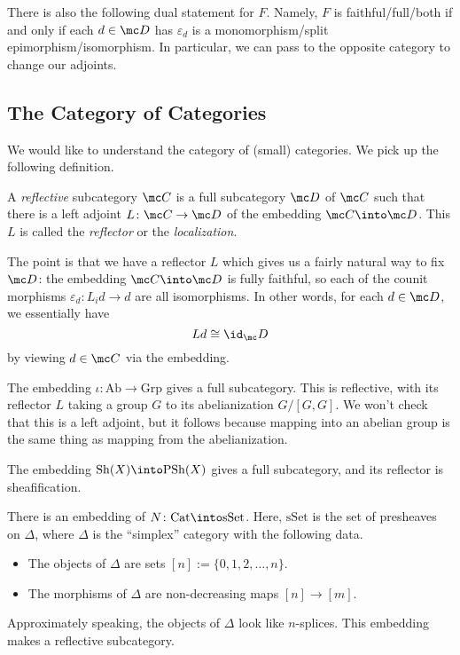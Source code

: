\documentclass[../notes.tex]{subfiles}
\begin{document}
\begin{remark}
	There is also the following dual statement for $F$. Namely, $F$ is faithful/full/both if and only if each $d\in\mc D$ has $\varepsilon_d$ is a monomorphism/split epimorphism/isomorphism. In particular, we can pass to the opposite category to change our adjoints.
\end{remark}

\subsection{The Category of Categories}
We would like to understand the category of (small) categories. We pick up the following definition.
\begin{definition}
	A \textit{reflective} subcategory $\mc C$ is a full subcategory $\mc D$ of $\mc C$ such that there is a left adjoint $L\colon\mc C\to\mc D$ of the embedding $\mc C\into\mc D$. This $L$ is called the \textit{reflector} or the \textit{localization}.
\end{definition}
The point is that we have a reflector $L$ which gives us a fairly natural way to fix $\mc D$: the embedding $\mc C\into\mc D$ is fully faithful, so each of the counit morphisms $\varepsilon_d\colon L_id\to d$ are all isomorphisms. In other words, for each $d\in\mc D$, we essentially have
\[Ld\cong\id_\mc D\]
by viewing $d\in\mc C$ via the embedding.
\begin{example}
	The embedding $\iota\colon\mathrm{Ab}\to\mathrm{Grp}$ gives a full subcategory. This is reflective, with its reflector $L$ taking a group $G$ to its abelianization $G/[G,G]$. We won't check that this is a left adjoint, but it follows because mapping into an abelian group is the same thing as mapping from the abelianization.
\end{example}
\begin{example}
	The embedding $\mathrm{Sh}(X)\into\mathrm{PSh}(X)$ gives a full subcategory, and its reflector is sheafification.
\end{example}
\begin{exe}
	There is an embedding of $N\colon\mathrm{Cat}\into\mathrm{sSet}$. Here, $\mathrm{sSet}$ is the set of presheaves on $\Delta$, where $\Delta$ is the ``simplex'' category with the following data.
	\begin{itemize}
		\item The objects of $\Delta$ are sets $[n]:=\{0,1,2,\ldots,n\}$.
		\item The morphisms of $\Delta$ are non-decreasing maps $[n]\to[m]$.
	\end{itemize}
	Approximately speaking, the objects of $\Delta$ look like $n$-splices. This embedding makes a reflective subcategory.
\end{exe}
\end{document}
